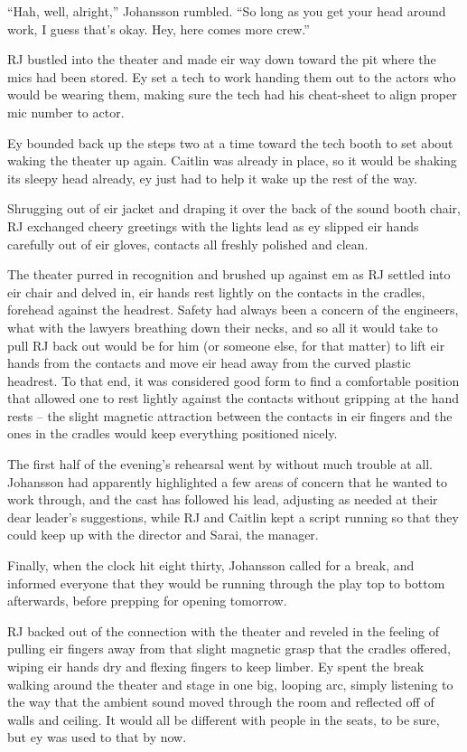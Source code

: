 ``Hah, well, alright,'' Johansson rumbled. ``So long as you get your head around work, I guess that's okay. Hey, here comes more crew.''

RJ bustled into the theater and made eir way down toward the pit where the mics had been stored. Ey set a tech to work handing them out to the actors who would be wearing them, making sure the tech had his cheat-sheet to align proper mic number to actor.

Ey bounded back up the steps two at a time toward the tech booth to set about waking the theater up again. Caitlin was already in place, so it would be shaking its sleepy head already, ey just had to help it wake up the rest of the way.

Shrugging out of eir jacket and draping it over the back of the sound booth chair, RJ exchanged cheery greetings with the lights lead as ey slipped eir hands carefully out of eir gloves, contacts all freshly polished and clean.

The theater purred in recognition and brushed up against em as RJ settled into eir chair and delved in, eir hands rest lightly on the contacts in the cradles, forehead against the headrest. Safety had always been a concern of the engineers, what with the lawyers breathing down their necks, and so all it would take to pull RJ back out would be for him (or someone else, for that matter) to lift eir hands from the contacts and move eir head away from the curved plastic headrest. To that end, it was considered good form to find a comfortable position that allowed one to rest lightly against the contacts without gripping at the hand rests -- the slight magnetic attraction between the contacts in eir fingers and the ones in the cradles would keep everything positioned nicely.

The first half of the evening's rehearsal went by without much trouble at all. Johansson had apparently highlighted a few areas of concern that he wanted to work through, and the cast has followed his lead, adjusting as needed at their dear leader's suggestions, while RJ and Caitlin kept a script running so that they could keep up with the director and Sarai, the manager.

Finally, when the clock hit eight thirty, Johansson called for a break, and informed everyone that they would be running through the play top to bottom afterwards, before prepping for opening tomorrow.

RJ backed out of the connection with the theater and reveled in the feeling of pulling eir fingers away from that slight magnetic grasp that the cradles offered, wiping eir hands dry and flexing fingers to keep limber. Ey spent the break walking around the theater and stage in one big, looping arc, simply listening to the way that the ambient sound moved through the room and reflected off of walls and ceiling. It would all be different with people in the seats, to be sure, but ey was used to that by now.

